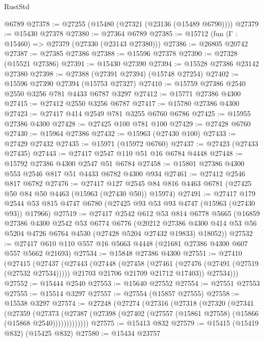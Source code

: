 \begin{lexlean}{RustStd}
\begin{coremodule}
    @6789
@27378 := @27255 (@15480 (@27321 (@23136 (@15489 @6790))))
@27379 := @15430 @27378
@27380 := @27364 @6789
@27385 := @15712 (fun (Γ : @15460) => @27379 (@27330 (@23143 @27380)))
@27386 := @26805 @20742
@27387 := @27385 @27386
@27388 := @15596 @27378
@27390 := @27328 (@15521 @27386)
@27391 := @15430 @27390
@27394 := @15528 @27386 @23142 @27380
@27398 := @27388 (@27391 @27394) (@15748 @27254)
@27402 := @15596 @27390 @27394 (@15753 @27327)
@27410 := @15759 @27386 @2540 @2550 @3256 @781 @4433 @6787 @3297
@27412 := @15771 @27386 @4300
@27415 := @27412 @2550 @3256 @6787
@27417 := @15780 @27386 @4300
@27423 := @27417 @414 @2549 @781 @3255 @6760 @6786
@27425 := @15955 @27386 @4300
@27428 := @27425 @100 @781 @100
@27429 := @27428 @6760
@27430 := @15964 @27386
@27432 := @15963 (@27430 @100)
@27433 := @27429 @27432
@27435 := @15971 (@15972 @6760)
@27437 := @27423 (@27433 @27435)
@27443 := @27417 @2547 @110 @51 @16 @6784 @4448
@27448 := @15792 @27386 @4300 @2547 @51 @6784
@27458 := @15801 @27386 @4300 @553 @2546 @817 @51 @4433 @6782 @4300 @934
@27461 := @27412 @2546 @817 @6782
@27476 := @27417
    @127
    @2545
    @84
    @816
    @4463
    @6781
    (@27425 @50 @84 @50 @4463 (@15963 (@27430 @50)) @15974)
@27491 := @27417
    @179
    @2544
    @53
    @815
    @4747
    @6780
    (@27425 @93 @53 @93 @4747 (@15963 (@27430 @93)) @17966)
@27519 := @27417
    @2542
    @612
    @53
    @814
    @6778
    @5665
    (@16859
      @27386
      @4300
      @2542
      @53
      @6774
      @6776
      (@20212
        @27386
        @4300
        @414
        @53
        @56
        @5204
        @4726
        @6764
        @4530
        (@27428 @5204 @27432 @19833)
        @18052))
@27532 := @27417 @610 @110 @557 @16 @5663 @4448 (@21681 @27386 @4300 @607 @557 @5662 @21693)
@27534 := @15848 @27386 @4300
@27551 := @27410
    (@27415
      (@27437
        (@27443
          (@27448
            (@27458
              (@27461 (@27476 (@27491 (@27519 (@27532 @27534)))))
              @21703
              @21706
              @21709
              @21712
              @17403))
          @27534)))
@27552 := @15444 @2540
@27553 := @15640 @27552
@27554 := @27551 @27553
@27555 := @15514 @3297
@27557 := @27554 (@15857 @27555)
@27558 := @15538 @3297
@27574 := @27248
    (@27274
      (@27316
        (@27318
          (@27320
            (@27341
              (@27359
                (@27373
                  (@27387 (@27398 (@27402 (@27557 (@15861 @27558) (@15866 (@15868 @2540)))))))))))))
@27575 := @15413 @832
@27579 := @15415 (@15419 @832) (@15425 @832)
@27580 := @15434 @23757

\end{coremodule}
\end{lexlean}

